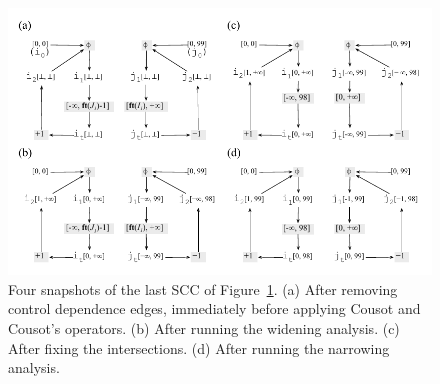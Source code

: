 \documentclass{llncs}
\begin{document}
\begin{figure}[t!]
\begin{center}
\includegraphics[width=\textwidth]{images/ex_partition_grow_crop}
\end{center}
\caption{\label{fig:ex_partition_grow_crop}
Four snapshots of the last SCC of Figure~\ref{fig:ex_partition_grow_crop}.
(a) After removing control dependence edges, immediately before applying
Cousot and Cousot's operators.
(b) After running the widening analysis.
(c) After fixing the intersections.
(d) After running the narrowing analysis.}
\end{figure}

%
\end{document}
